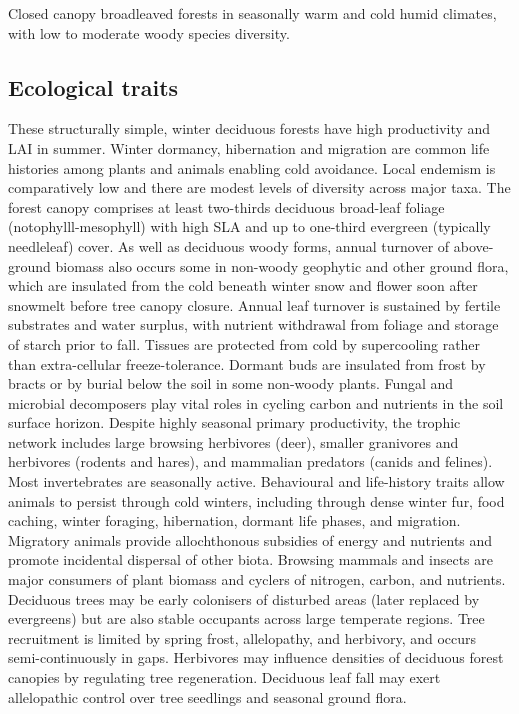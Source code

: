 \documentclass[
  letterpaper,
  DIV=11,
  numbers=noendperiod]{scrartcl}
\begin{document}
Closed canopy broadleaved forests in seasonally warm and cold humid
climates, with low to moderate woody species diversity.

\subsection{Ecological traits}\label{ecological-traits-74}

These structurally simple, winter deciduous forests have high
productivity and LAI in summer. Winter dormancy, hibernation and
migration are common life histories among plants and animals enabling
cold avoidance. Local endemism is comparatively low and there are modest
levels of diversity across major taxa. The forest canopy comprises at
least two-thirds deciduous broad-leaf foliage (notophylll-mesophyll)
with high SLA and up to one-third evergreen (typically needleleaf)
cover. As well as deciduous woody forms, annual turnover of above-ground
biomass also occurs some in non-woody geophytic and other ground flora,
which are insulated from the cold beneath winter snow and flower soon
after snowmelt before tree canopy closure. Annual leaf turnover is
sustained by fertile substrates and water surplus, with nutrient
withdrawal from foliage and storage of starch prior to fall. Tissues are
protected from cold by supercooling rather than extra-cellular
freeze-tolerance. Dormant buds are insulated from frost by bracts or by
burial below the soil in some non-woody plants. Fungal and microbial
decomposers play vital roles in cycling carbon and nutrients in the soil
surface horizon. Despite highly seasonal primary productivity, the
trophic network includes large browsing herbivores (deer), smaller
granivores and herbivores (rodents and hares), and mammalian predators
(canids and felines). Most invertebrates are seasonally active.
Behavioural and life-history traits allow animals to persist through
cold winters, including through dense winter fur, food caching, winter
foraging, hibernation, dormant life phases, and migration. Migratory
animals provide allochthonous subsidies of energy and nutrients and
promote incidental dispersal of other biota. Browsing mammals and
insects are major consumers of plant biomass and cyclers of nitrogen,
carbon, and nutrients. Deciduous trees may be early colonisers of
disturbed areas (later replaced by evergreens) but are also stable
occupants across large temperate regions. Tree recruitment is limited by
spring frost, allelopathy, and herbivory, and occurs semi-continuously
in gaps. Herbivores may influence densities of deciduous forest canopies
by regulating tree regeneration. Deciduous leaf fall may exert
allelopathic control over tree seedlings and seasonal ground flora.
\end{document}
